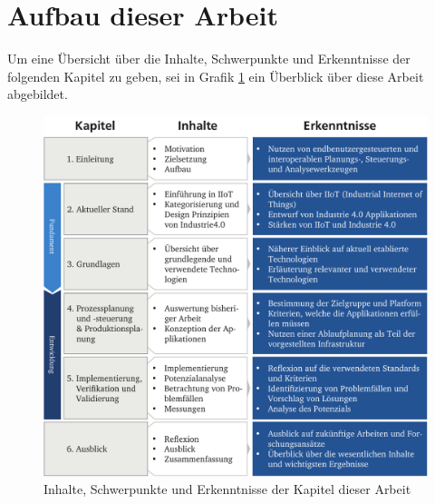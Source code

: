 \section{Aufbau dieser Arbeit}
\label{sec:aufbau}

Um eine Übersicht über die Inhalte, Schwerpunkte und Erkenntnisse der folgenden Kapitel zu geben, sei in Grafik \ref{fig:aufbauDerArbeit} ein Überblick über diese Arbeit abgebildet.
%
\begin{figure}[htbp]
	\centering\includegraphics[width=1.0\textwidth]{images/01/aufbauDerArbeit.pdf}
    \caption{Inhalte, Schwerpunkte und Erkenntnisse der Kapitel dieser Arbeit}
    \label{fig:aufbauDerArbeit}
\end{figure}
